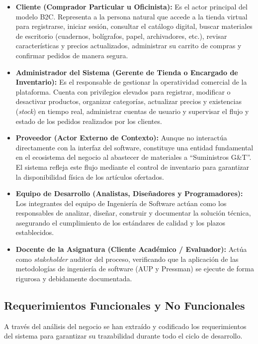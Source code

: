 \begin{itemize}
    \item \textbf{Cliente (Comprador Particular u Oficinista):} Es el actor principal del modelo B2C. Representa a la persona natural que accede a la tienda virtual para registrarse, iniciar sesión, consultar el catálogo digital, buscar materiales de escritorio (cuadernos, bolígrafos, papel, archivadores, etc.), revisar características y precios actualizados, administrar su carrito de compras y confirmar pedidos de manera segura.
    \item \textbf{Administrador del Sistema (Gerente de Tienda o Encargado de Inventario):} Es el responsable de gestionar la operatividad comercial de la plataforma. Cuenta con privilegios elevados para registrar, modificar o desactivar productos, organizar categorías, actualizar precios y existencias (\textit{stock}) en tiempo real, administrar cuentas de usuario y supervisar el flujo y estado de los pedidos realizados por los clientes.
    \item \textbf{Proveedor (Actor Externo de Contexto):} Aunque no interactúa directamente con la interfaz del software, constituye una entidad fundamental en el ecosistema del negocio al abastecer de materiales a ``Suministros G\&T''. El sistema refleja este flujo mediante el control de inventario para garantizar la disponibilidad física de los artículos ofertados.
    \item \textbf{Equipo de Desarrollo (Analistas, Diseñadores y Programadores):} Los integrantes del equipo de Ingeniería de Software actúan como los responsables de analizar, diseñar, construir y documentar la solución técnica, asegurando el cumplimiento de los estándares de calidad y los plazos establecidos.
    \item \textbf{Docente de la Asignatura (Cliente Académico / Evaluador):} Actúa como \textit{stakeholder} auditor del proceso, verificando que la aplicación de las metodologías de ingeniería de software (AUP y Pressman) se ejecute de forma rigurosa y debidamente documentada.
\end{itemize}

\subsection{Requerimientos Funcionales y No Funcionales}

A través del análisis del negocio se han extraído y codificado los requerimientos del sistema para garantizar su trazabilidad durante todo el ciclo de desarrollo.

